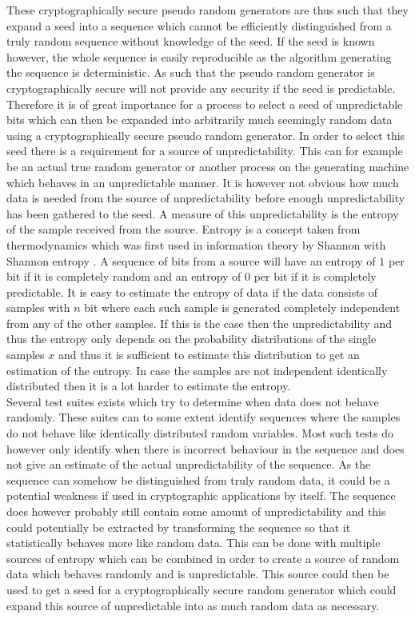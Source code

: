 \documentclass[a4paper,11pt]{report}
\begin{document}
\noindent
These cryptographically secure pseudo random generators are thus such that 
they expand a seed into a sequence which cannot be efficiently distinguished 
from a truly random sequence without knowledge of the seed. If the seed is 
known however, the whole sequence is easily reproducible as the algorithm 
generating the sequence is deterministic. As such that the pseudo random
generator is cryptographically secure will not provide any security if the seed
is predictable. Therefore it is of great importance for a process to select a 
seed of unpredictable bits which can then be expanded into arbitrarily much 
seemingly random data using a cryptographically secure pseudo random generator.
In order to select
this seed there is a requirement for a source of unpredictability. This can
for example be an actual true random generator or another process on the 
generating machine which behaves in an unpredictable manner. It is however not
obvious how much data is needed from the source of unpredictability before 
enough unpredictability has been gathered to the seed. A measure of this 
unpredictability is the entropy of the sample received from the source.
Entropy is a concept taken from thermodynamics which was first used in 
information theory by Shannon with Shannon entropy
\cite{Shannon:2001:MTC:584091.584093}.
A sequence of bits from a source will have an entropy of $1$ per bit if
it is completely random and an entropy of $0$ per bit if it is 
completely predictable. It is easy to estimate the entropy of 
data if the data consists of samples with $n$ bit where each such sample is
generated completely independent from any of the other samples. If this is the 
case then the unpredictability and thus the entropy only depends on the 
probability distributions of the single samples $x$ and thus it is sufficient
to estimate this distribution to get an estimation of the entropy.
In case the samples are not independent identically distributed then it 
is a lot harder to estimate the entropy. \\

\noindent
Several test suites exists which try to determine when data does not behave 
randomly\cite{Ecuyer2007}\cite{Bassham:2010:SRS:2206233}.
These suites can to some extent 
identify sequences where the samples do not behave like identically distributed
random variables. Most such tests do however only identify when there is 
incorrect behaviour in the sequence and does not give an estimate of the actual
unpredictability of the sequence. As the sequence can somehow be distinguished 
from truly random data, it could be a potential weakness if used in 
cryptographic applications by itself. The sequence does however probably still
contain some amount of unpredictability and this could potentially be extracted
by transforming the sequence so that it statistically behaves more like random
data. This can be done with multiple sources of entropy which can be combined 
in order to create a source of random data which behaves randomly and is 
unpredictable. This source could then be used to get a seed for a
cryptographically secure random generator which could expand this source of 
unpredictable into as much random data as necessary.\\
\end{document}
